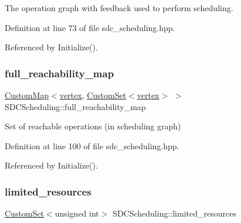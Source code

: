 The operation graph with feedback used to perform scheduling. 



Definition at line 73 of file sdc\+\_\+scheduling.\+hpp.



Referenced by Initialize().

\mbox{\label{classSDCScheduling_a5deb967dd6434ccdca93c2a8ecfb6c96}} 
\subsubsection{\texorpdfstring{full\+\_\+reachability\+\_\+map}{full\_reachability\_map}}
{\footnotesize\ttfamily \hyperlink{custom__map_8hpp_a18ca01763abbe3e5623223bfe5aaac6b}{Custom\+Map}$<$\hyperlink{graph_8hpp_abefdcf0544e601805af44eca032cca14}{vertex}, \hyperlink{custom__set_8hpp_a615bc2f42fc38a4bb1790d12c759e86f}{Custom\+Set}$<$\hyperlink{graph_8hpp_abefdcf0544e601805af44eca032cca14}{vertex}$>$ $>$ S\+D\+C\+Scheduling\+::full\+\_\+reachability\+\_\+map\hspace{0.3cm}{\ttfamily [protected]}}



Set of reachable operations (in scheduling graph) 



Definition at line 100 of file sdc\+\_\+scheduling.\+hpp.



Referenced by Initialize().

\mbox{\label{classSDCScheduling_a2ed924e6855e557c34362b40c7e92485}} 
\subsubsection{\texorpdfstring{limited\+\_\+resources}{limited\_resources}}
{\footnotesize\ttfamily \hyperlink{custom__set_8hpp_a615bc2f42fc38a4bb1790d12c759e86f}{Custom\+Set}$<$unsigned int$>$ S\+D\+C\+Scheduling\+::limited\+\_\+resources\hspace{0.3cm}{\ttfamily [protected]}}



